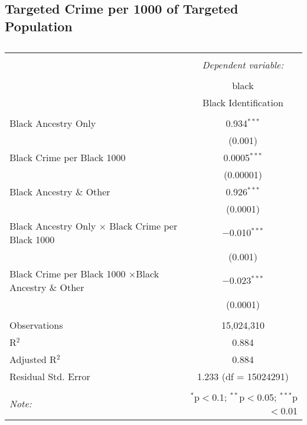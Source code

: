 \documentclass{article}
\begin{document}
\subsection{Targeted Crime per 1000 of Targeted Population}
    \begin{table}[!htbp] \centering 
      \caption{} 
      \label{} 
    \begin{tabular}{@{\extracolsep{5pt}}lc} 
    \\[-1.8ex]\hline 
    \hline \\[-1.8ex] 
     & \multicolumn{1}{c}{\textit{Dependent variable:}} \\ 
    \cline{2-2} 
    \\[-1.8ex] & black \\ 
     & Black Identification \\ 
    \hline \\[-1.8ex] 
     Black Ancestry Only & 0.934$^{***}$ \\ 
      & (0.001) \\ 
     Black Crime per Black 1000 & 0.0005$^{***}$ \\ 
      & (0.00001) \\ 
     Black Ancestry \& Other & 0.926$^{***}$ \\ 
      & (0.0001) \\ 
     Black Ancestry Only $\times$ Black Crime per Black 1000 & $-$0.010$^{***}$ \\ 
      & (0.001) \\ 
     Black Crime per Black 1000 $\times$Black Ancestry \& Other & $-$0.023$^{***}$ \\ 
      & (0.0001) \\ 
    \hline \\[-1.8ex] 
    Observations & 15,024,310 \\ 
    R$^{2}$ & 0.884 \\ 
    Adjusted R$^{2}$ & 0.884 \\ 
    Residual Std. Error & 1.233 (df = 15024291) \\ 
    \hline 
    \hline \\[-1.8ex] 
    \textit{Note:}  & \multicolumn{1}{r}{$^{*}$p$<$0.1; $^{**}$p$<$0.05; $^{***}$p$<$0.01} \\ 
    \end{tabular} 
    \end{table} 
\end{document}

